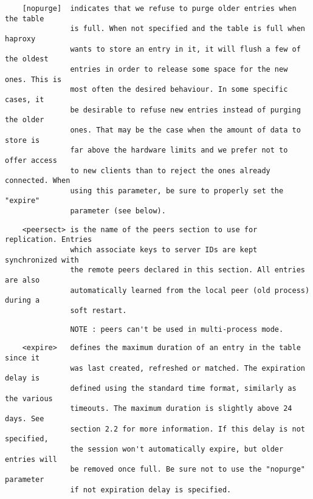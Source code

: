 \begin{verbatim}
    [nopurge]  indicates that we refuse to purge older entries when the table
               is full. When not specified and the table is full when haproxy
               wants to store an entry in it, it will flush a few of the oldest
               entries in order to release some space for the new ones. This is
               most often the desired behaviour. In some specific cases, it
               be desirable to refuse new entries instead of purging the older
               ones. That may be the case when the amount of data to store is
               far above the hardware limits and we prefer not to offer access
               to new clients than to reject the ones already connected. When
               using this parameter, be sure to properly set the "expire"
               parameter (see below).
\end{verbatim}

\begin{verbatim}
    <peersect> is the name of the peers section to use for replication. Entries
               which associate keys to server IDs are kept synchronized with
               the remote peers declared in this section. All entries are also
               automatically learned from the local peer (old process) during a
               soft restart.
\end{verbatim}

\begin{verbatim}
               NOTE : peers can't be used in multi-process mode.
\end{verbatim}

\begin{verbatim}
    <expire>   defines the maximum duration of an entry in the table since it
               was last created, refreshed or matched. The expiration delay is
               defined using the standard time format, similarly as the various
               timeouts. The maximum duration is slightly above 24 days. See
               section 2.2 for more information. If this delay is not specified,
               the session won't automatically expire, but older entries will
               be removed once full. Be sure not to use the "nopurge" parameter
               if not expiration delay is specified.
\end{verbatim}


